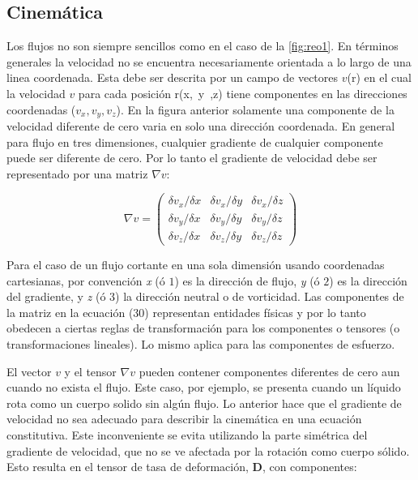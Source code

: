 \subsection{Cinemática}
Los flujos no son siempre sencillos como en el caso de la \autoref{fig:reo1}. En términos generales la velocidad no se encuentra necesariamente orientada a lo largo de una linea coordenada. Esta debe ser descrita por un campo de vectores $v$(r) en el cual la velocidad $v$ para cada posición r(x,~y~,z) tiene componentes en las direcciones coordenadas ($v_{x},v_{y},v_{z}$). En la figura anterior solamente una componente de la velocidad diferente de cero varia en solo una dirección coordenada. En general para flujo en tres dimensiones, cualquier gradiente de cualquier componente puede ser diferente de cero. Por lo tanto el gradiente de velocidad debe ser representado por una matriz $\nabla v$:

\begin{equation} 
\nabla v = \left( 
\begin{matrix} 
\delta v_{x}/\delta{x} & \delta v_{x}/\delta{y} & \delta v_{x}/\delta{z} \\
\delta v_{y}/\delta{x} & \delta v_{y}/\delta{y} & \delta v_{y}/\delta{z} \\
\delta v_{z}/\delta{x} & \delta v_{z}/\delta{y} & \delta v_{z}/\delta{z} 
\end{matrix} \right)
\end{equation}

Para el caso de un flujo cortante en una sola dimensión usando coordenadas cartesianas, por convención \emph{x} (ó $1$) es la dirección de flujo, \emph{y} (ó $2$) es la dirección del gradiente, y \emph{z} (ó 3) la dirección neutral o de vorticidad. Las componentes de la matriz en la ecuación (30) representan entidades físicas y por lo tanto obedecen a ciertas reglas de transformación para los componentes o tensores (o transformaciones lineales). Lo mismo aplica para las componentes de esfuerzo.

El vector $v$ y el tensor $\nabla v$ pueden contener componentes diferentes de cero aun cuando no exista el flujo. Este caso, por ejemplo, se presenta cuando un líquido rota como un cuerpo solido sin algún flujo. Lo anterior hace que el gradiente de velocidad no sea adecuado para describir la cinemática en una ecuación constitutiva. Este inconveniente se evita utilizando la parte simétrica del gradiente de velocidad, que no se ve afectada por la rotación como cuerpo sólido. Esto resulta en el tensor de tasa de deformación, \textbf{D}, con componentes:

